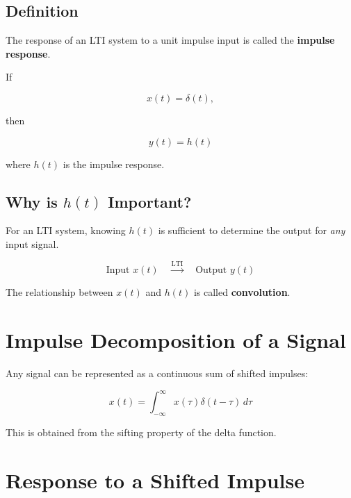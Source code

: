 
\subsection{Definition}

The response of an LTI system to a unit impulse input is called the
\textbf{impulse response}.

If

\[
x(t)=\delta(t),
\]

then

\[
\boxed{
y(t)=h(t)
}
\]

where \(h(t)\) is the impulse response.


\subsection{Why is \(h(t)\) Important?}

For an LTI system, knowing \(h(t)\) is sufficient to determine the output for
\emph{any} input signal.

\[
\boxed{
\text{Input }x(t)
\quad \xrightarrow{\text{LTI}}
\quad
\text{Output }y(t)
}
\]

The relationship between \(x(t)\) and \(h(t)\) is called
\textbf{convolution}.


\section{Impulse Decomposition of a Signal}

Any signal can be represented as a continuous sum of shifted impulses:

\[
\boxed{
x(t)=\int_{-\infty}^{\infty}x(\tau)\delta(t-\tau)\,d\tau
}
\]

This is obtained from the sifting property of the delta function.


\section{Response to a Shifted Impulse}


